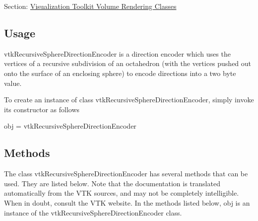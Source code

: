 Section\-: \hyperlink{sec_vtkvolumerendering}{Visualization Toolkit Volume Rendering Classes} \hypertarget{vtkwidgets_vtkxyplotwidget_Usage}{}\subsection{Usage}\label{vtkwidgets_vtkxyplotwidget_Usage}
vtk\-Recursive\-Sphere\-Direction\-Encoder is a direction encoder which uses the vertices of a recursive subdivision of an octahedron (with the vertices pushed out onto the surface of an enclosing sphere) to encode directions into a two byte value.

To create an instance of class vtk\-Recursive\-Sphere\-Direction\-Encoder, simply invoke its constructor as follows \begin{DoxyVerb}  obj = vtkRecursiveSphereDirectionEncoder
\end{DoxyVerb}
 \hypertarget{vtkwidgets_vtkxyplotwidget_Methods}{}\subsection{Methods}\label{vtkwidgets_vtkxyplotwidget_Methods}
The class vtk\-Recursive\-Sphere\-Direction\-Encoder has several methods that can be used. They are listed below. Note that the documentation is translated automatically from the V\-T\-K sources, and may not be completely intelligible. When in doubt, consult the V\-T\-K website. In the methods listed below, {\ttfamily obj} is an instance of the vtk\-Recursive\-Sphere\-Direction\-Encoder class. 
